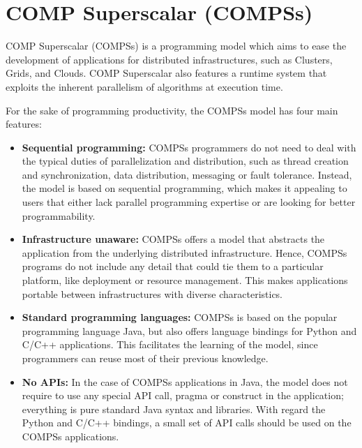 \section{COMP Superscalar (COMPSs)}
\label{sec:Introduction}

COMP Superscalar (COMPSs) is a programming model which aims to ease the development of 
applications for distributed infrastructures, such as Clusters, Grids, and Clouds. COMP 
Superscalar also features a runtime system that exploits the inherent parallelism of 
algorithms at execution time.

For the sake of programming productivity, the COMPSs model has four main features:


\begin{itemize}

 \item  {\bf Sequential programming:} COMPSs programmers do not need to deal 
 with the typical duties of parallelization and distribution, such as thread 
 creation and synchronization, data distribution, messaging or fault tolerance. 
 Instead, the model is based on sequential programming, which makes it appealing 
 to users that either lack parallel programming expertise or are looking for 
 better programmability.
 
 \item  {\bf Infrastructure unaware:} COMPSs offers a model that abstracts the 
 application from the underlying distributed infrastructure. Hence, COMPSs 
 programs do not include any detail that could tie them to a particular 
 platform, like deployment or resource management. This makes applications 
 portable between infrastructures with diverse characteristics.
 
 \item  {\bf Standard programming languages:} COMPSs is based on the popular 
 programming language Java, but also offers language bindings for Python and 
 C/C++ applications. This facilitates the learning of the model, since 
 programmers can reuse most of their previous knowledge.
 
 \item  {\bf No APIs:} In the case of COMPSs applications in Java, the model 
 does not require to use any special API call, pragma or construct in the 
 application; everything is pure standard Java syntax and libraries. With 
 regard the Python and C/C++ bindings, a small set of API calls should be used 
 on the COMPSs applications.

\end{itemize}

